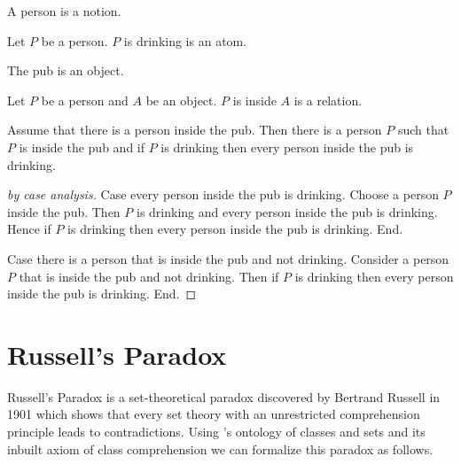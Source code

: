 \documentclass{article}
\begin{document}
  \begin{forthel}
    \begin{signature}
      A person is a notion.
    \end{signature}

    \begin{signature}
      Let $P$ be a person.
      $P$ is drinking is an atom.
    \end{signature}

    \begin{signature}
      The pub is an object.
    \end{signature}

    \begin{signature}
      Let $P$ be a person and $A$ be an object.
      $P$ is inside $A$ is a relation.
    \end{signature}

    \begin{theorem}
      Assume that there is a person inside the pub.
      Then there is a person $P$ such that $P$ is inside the pub and if $P$ is
      drinking then every person inside the pub is drinking.
    \end{theorem}
    \begin{proof}[by case analysis]
      Case every person inside the pub is drinking.
        Choose a person $P$ inside the pub.
        Then $P$ is drinking and every person inside the pub is drinking.
        Hence if $P$ is drinking then every person inside the pub is drinking.
      End.

      Case there is a person that is inside the pub and not drinking.
        Consider a person $P$ that is inside the pub and not drinking.
        Then if $P$ is drinking then every person inside the pub is drinking.
      End.
    \end{proof}
  \end{forthel}


  \section*{Russell's Paradox}

  Russell's Paradox is a set-theoretical paradox discovered by Bertrand Russell
  in 1901 which shows that every set theory with an unrestricted comprehension
  principle leads to contradictions.
  Using \Naproche's ontology of classes and sets and its inbuilt axiom of class
  comprehension we can formalize this paradox as follows.
\end{document}
